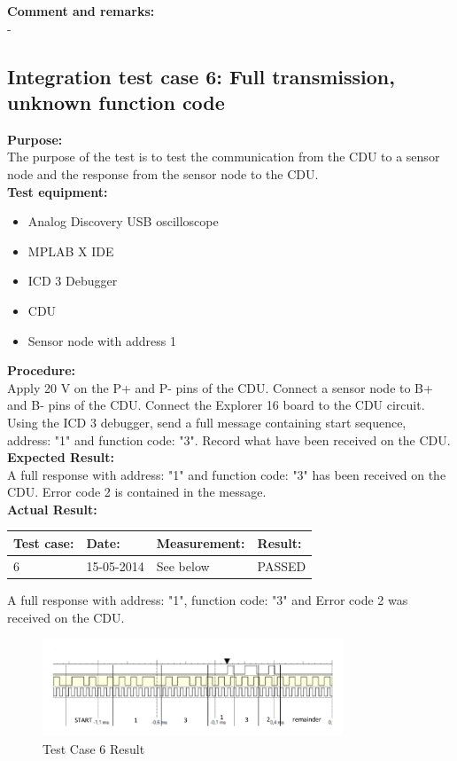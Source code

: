 \textbf{Comment and remarks:}\\
-\\

\subsection{Integration test case 6: Full transmission, unknown function code}
\textbf{Purpose:}\\
The purpose of the test is to test the communication from the CDU to a sensor node and the response from the sensor node to the CDU.\\

\textbf{Test equipment:}
\begin{itemize}
\item Analog Discovery USB oscilloscope
\item MPLAB X IDE
\item ICD 3 Debugger
\item CDU
\item Sensor node with address 1
\end{itemize}

\textbf{Procedure:}\\
Apply 20 V on the P+ and P- pins of the CDU. Connect a sensor node to B+ and B- pins of the CDU. Connect the Explorer 16 board to the CDU circuit. Using the ICD 3 debugger, send a full message containing start sequence, address: "1" and function code: "3". Record what have been received on the CDU.\\

\textbf{Expected Result:}\\
A full response with address: "1" and function code: "3" has been received on the CDU. Error code 2 is contained in the message.\\

\textbf{Actual Result:}\\
\begin{table}[H]
\centering
\begin{tabular}{|p{2cm}|p{2cm}|p{3cm}|p{2cm}|}\hline
\textbf{Test case:} & \textbf{Date:} & \textbf{Measurement:} & \textbf{Result:} \\ \hline
6 & 15-05-2014 & See below & PASSED \\ \hline
\end{tabular}
\end{table}
A full response with address: "1", function code: "3" and Error code 2 was received on the CDU.
\begin{figure}[H]
\centering
\includegraphics[width=0.8\textwidth]{billeder/intetestcase6}
\caption{Test Case 6 Result}
\label{fig:InteTestCase6}
\end{figure}

